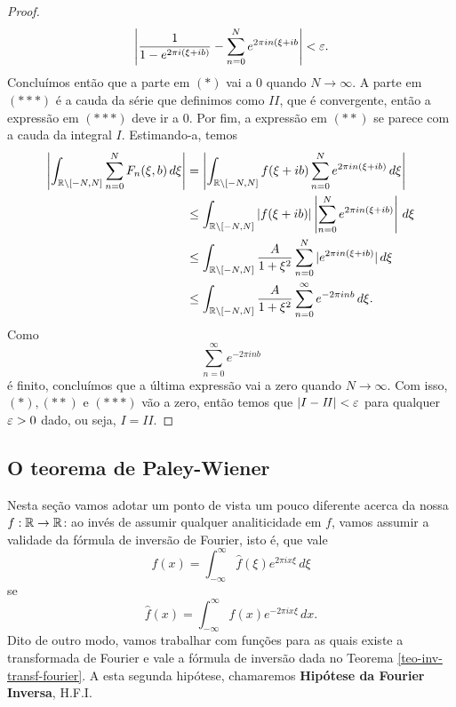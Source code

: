 \begin{proof}
\begin{equation*}
            \left|\frac{1}{1 - e^{2\pi i(\xi + ib)}} - 
            \sum_{n=0}^{N}e^{2\pi i n(\xi + ib}\right| < \varepsilon. 
        \end{equation*}
        Concluímos então que a parte em $(*)$ vai a $0$ quando $N \to \infty$. 
        A parte em $(***)$ é a cauda da série que definimos como $\mathit{II}$, 
        que é convergente, então a expressão em $(***)$ deve ir a $0$. 
        Por fim, a expressão em $(**)$ se parece com a cauda da integral $I$.
        Estimando-a, temos
        \begin{align*}
            \left|\int_{\mathbb{R} \setminus [-N,N]}\sum_{n=0}^{N}F_n(\xi,b) \, d\xi\right| 
            &= \left|\int_{\mathbb{R} \setminus [-N,N]}f(\xi + ib)\sum_{n=0}^{N}
            e^{2\pi i n(\xi + ib)} \, d\xi\right| \\
            &\leq \int_{\mathbb{R} \setminus [-N,N]}|f(\xi + ib)|\left|\sum_{n=0}^{N}
            e^{2\pi i n(\xi + ib)} \right|\, d\xi \\
            &\leq \int_{\mathbb{R} \setminus [-N,N]}\frac{A}{1 + \xi^2} 
            \sum_{n=0}^{N}|e^{2\pi i n(\xi + ib)}| \, d\xi \\
            &\leq \int_{\mathbb{R} \setminus [-N,N]}\frac{A}{1 + \xi^2}
            \sum_{n=0}^{\infty}e^{-2\pi i nb} \, d\xi. 
        \end{align*}
        Como 
        \begin{equation*}
            \sum_{n=0}^{\infty} e^{-2\pi i nb}
        \end{equation*}
        é finito, concluímos que 
        a última expressão vai a zero quando $N \to \infty$. Com isso, 
        $(*), (**)$ e $(***)$ vão a zero, então temos que $|I - \mathit{II}|< \varepsilon$ para 
        qualquer $\varepsilon>0$ dado, ou seja, $I = \mathit{II}$.
        \end{proof}
    \subsection{O teorema de Paley-Wiener}
        Nesta seção vamos adotar um ponto de vista um pouco diferente acerca da nossa $f:\mathbb{R}\to\mathbb{R}$: 
        ao invés de assumir qualquer analiticidade em $f$, vamos assumir a validade da fórmula de 
        inversão de Fourier, isto é,
        que vale
        \begin{equation*}
            f(x) = \int_{-\infty}^{\infty} \widehat{f}(\xi) e^{2\pi ix\xi} \, d\xi
        \end{equation*}
        se
        \begin{equation*}
            \widehat{f}(x) = \int_{-\infty}^{\infty} f(x) e^{-2\pi ix\xi} \, dx.
        \end{equation*}
        Dito de outro modo, vamos trabalhar com funções para as quais existe a transformada de Fourier
        e vale a fórmula de inversão dada no Teorema \ref{teo-inv-transf-fourier}. A esta segunda
        hipótese, chamaremos {\bf Hipótese da Fourier Inversa}, H.F.I.
        
